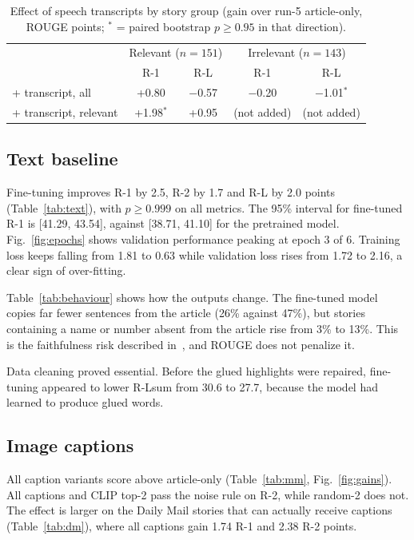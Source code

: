 \documentclass[conference]{IEEEtran}
\begin{document}
\begin{table}[t]
\caption{Effect of speech transcripts by story group (gain over run-5 article-only, ROUGE points; $^{*}$ = paired bootstrap $p\ge0.95$ in that direction).}
\label{tab:audio}
\centering
\setlength{\tabcolsep}{4pt}
\begin{tabular}{lcccc}
\toprule
 & \multicolumn{2}{c}{Relevant ($n{=}151$)} & \multicolumn{2}{c}{Irrelevant ($n{=}143$)} \\
 & R-1 & R-L & R-1 & R-L \\
\midrule
+ transcript, all      & +0.80 & $-$0.57 & $-$0.20 & $-$1.01$^{*}$ \\
+ transcript, relevant & +1.98$^{*}$ & +0.95 & (not added) & (not added) \\
\bottomrule
\end{tabular}
\end{table}

\subsection{Text baseline}
Fine-tuning improves R-1 by 2.5, R-2 by 1.7 and R-L by 2.0 points (Table~\ref{tab:text}), with $p\ge0.999$ on all metrics. The 95\% interval for fine-tuned R-1 is [41.29, 43.54], against [38.71, 41.10] for the pretrained model. Fig.~\ref{fig:epochs} shows validation performance peaking at epoch 3 of 6. Training loss keeps falling from 1.81 to 0.63 while validation loss rises from 1.72 to 2.16, a clear sign of over-fitting.

Table~\ref{tab:behaviour} shows how the outputs change. The fine-tuned model copies far fewer sentences from the article (26\% against 47\%), but stories containing a name or number absent from the article rise from 3\% to 13\%. This is the faithfulness risk described in~\cite{maynez2020faithfulness}, and ROUGE does not penalize it.

Data cleaning proved essential. Before the glued highlights were repaired, fine-tuning appeared to lower R-Lsum from 30.6 to 27.7, because the model had learned to produce glued words.

\subsection{Image captions}
All caption variants score above article-only (Table~\ref{tab:mm}, Fig.~\ref{fig:gains}). All captions and CLIP top-2 pass the noise rule on R-2, while random-2 does not. The effect is larger on the Daily Mail stories that can actually receive captions (Table~\ref{tab:dm}), where all captions gain 1.74 R-1 and 2.38 R-2 points.
\end{document}
